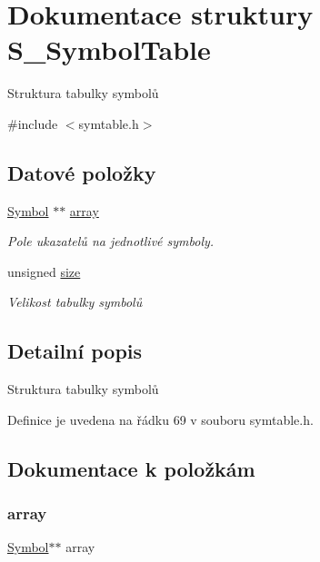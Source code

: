 \hypertarget{struct_s___symbol_table}{}\section{Dokumentace struktury S\+\_\+\+Symbol\+Table}
\label{struct_s___symbol_table}


Struktura tabulky symbolů  




{\ttfamily \#include $<$symtable.\+h$>$}

\subsection*{Datové položky}
\begin{DoxyCompactItemize}
\item 
\hyperlink{symtable_8h_af824f438f84b7f736304f25632681acd}{Symbol} $\ast$$\ast$ \hyperlink{struct_s___symbol_table_a06b644c328ee6593364cb30344544f00}{array}
\begin{DoxyCompactList}\small\item\em Pole ukazatelů na jednotlivé symboly. \end{DoxyCompactList}\item 
unsigned \hyperlink{struct_s___symbol_table_a245260f6f74972558f61b85227df5aae}{size}
\begin{DoxyCompactList}\small\item\em Velikost tabulky symbolů \end{DoxyCompactList}\end{DoxyCompactItemize}


\subsection{Detailní popis}
Struktura tabulky symbolů 

Definice je uvedena na řádku 69 v souboru symtable.\+h.



\subsection{Dokumentace k položkám}
\mbox{\label{struct_s___symbol_table_a06b644c328ee6593364cb30344544f00}} 
\subsubsection{\texorpdfstring{array}{array}}
{\footnotesize\ttfamily \hyperlink{symtable_8h_af824f438f84b7f736304f25632681acd}{Symbol}$\ast$$\ast$ array}



